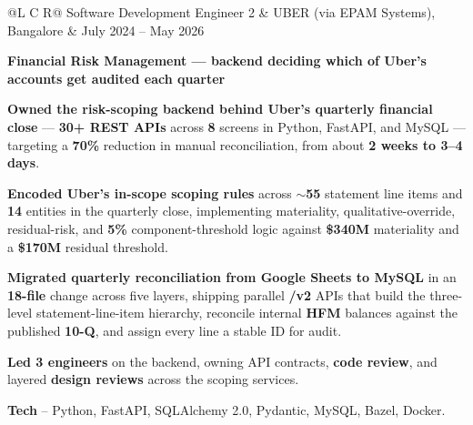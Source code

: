 \vspace{0.6ex}
\noindent
\begin{tabularx}{\textwidth}{@{}L C R@{}}
\textcolor{role}{Software Development Engineer 2} & \textcolor{company}{UBER (via EPAM Systems), Bangalore} & \textcolor{date}{July 2024 -- May 2026}\\
\end{tabularx}
\vspace{-1.6ex}

\textcolor{Project}{\textbf{Financial Risk Management --- backend deciding which of Uber's accounts get audited each quarter}}
\vspace{-0.6ex}
\begin{zitemize}
    \item \textbf{Owned the risk-scoping backend behind Uber's quarterly financial close} --- \textbf{30+ REST APIs} across \textbf{8} screens in Python, FastAPI, and MySQL --- targeting a \textbf{70\%} reduction in manual reconciliation, from about \textbf{2 weeks to 3--4 days}.
    \item \textbf{Encoded Uber's in-scope scoping rules} across \textbf{$\sim$55} statement line items and \textbf{14} entities in the quarterly close, implementing materiality, qualitative-override, residual-risk, and \textbf{5\%} component-threshold logic against \textbf{\$340M} materiality and a \textbf{\$170M} residual threshold.
    \item \textbf{Migrated quarterly reconciliation from Google Sheets to MySQL} in an \textbf{18-file} change across five layers, shipping parallel \textbf{/v2} APIs that build the three-level statement-line-item hierarchy, reconcile internal \textbf{HFM} balances against the published \textbf{10-Q}, and assign every line a stable ID for audit.
    \item \textbf{Led 3 engineers} on the backend, owning API contracts, \textbf{code review}, and layered \textbf{design reviews} across the scoping services.
    \item \textbf{Tech} -- Python, FastAPI, SQLAlchemy 2.0, Pydantic, MySQL, Bazel, Docker.
\end{zitemize}
\vspace{0.5ex}

